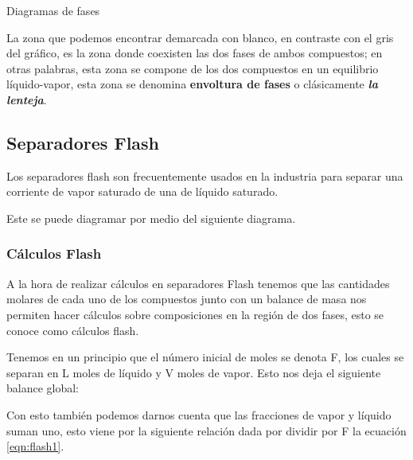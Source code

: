 \begin{images}{Diagramas de fases}
\end{images}

La zona que podemos encontrar demarcada con blanco, en contraste con el gris del gráfico, es la zona donde coexisten las dos fases de ambos compuestos; en otras palabras,
esta zona se compone de los dos compuestos en un equilibrio líquido-vapor, esta zona se denomina \textbf{envoltura de fases} o clásicamente \textit{\textbf{la lenteja}}.

\clearpage
\subsection{Separadores Flash}

Los separadores flash son frecuentemente usados en la industria para separar una corriente de vapor saturado de una de líquido saturado.

Este se puede diagramar por medio del siguiente diagrama.

\subsubsection{Cálculos Flash}
A la hora de realizar cálculos en separadores Flash tenemos que las cantidades molares de cada uno de los compuestos 
junto con un balance de masa nos permiten hacer cálculos sobre composiciones en la región de dos fases, esto se conoce como cálculos flash.

Tenemos en un principio que el número inicial de moles se denota F, los cuales se separan en L moles de líquido y V moles de vapor. Esto nos deja el siguiente balance global:

\insertequation[\label{eqn:flash1}]{F=L+V}{}

Con esto también podemos darnos cuenta que las fracciones de vapor y líquido suman uno, esto viene por la siguiente relación dada por dividir por F la ecuación \ref{eqn:flash1}.

